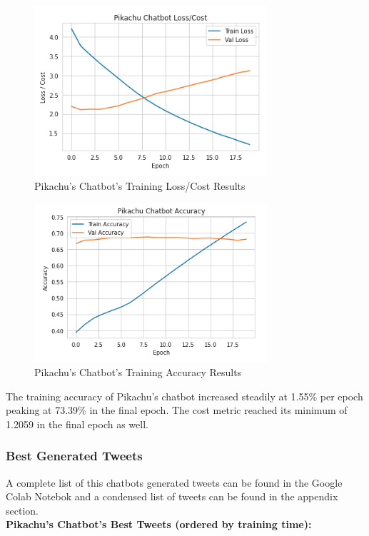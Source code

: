 \documentclass[5p,authoryear]{elsarticle}
\begin{document}
\begin{figure}[!htb] \centering
	\includegraphics[width=3.4in]{figures/Pika_Loss.png}
	\caption[]{Pikachu’s Chatbot’s Training Loss/Cost Results} 
	\label{Pika Loss} 
\end{figure}

\begin{figure}[!htb] \centering
	\includegraphics[width=3.4in]{figures/Pika_Acc.png}
	\caption[]{Pikachu’s Chatbot’s Training Accuracy Results} 
	\label{Pika Acc} 
\end{figure}


The training accuracy of Pikachu’s chatbot increased steadily at 1.55\% per epoch peaking at 73.39\% in the final epoch. The cost metric reached its minimum of 1.2059 in the final epoch as well. 


\subsubsection{Best Generated Tweets}

A complete list of this chatbots generated tweets can be found in the Google Colab Notebok and a condensed list of tweets can be found in the appendix section.\\

\textbf{Pikachu’s Chatbot’s Best Tweets (ordered by training time):}\\
\end{document}
